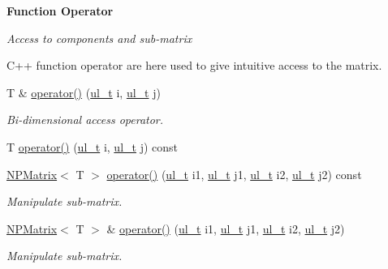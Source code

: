 \begin{Indent}\textbf{ Function Operator}\par
{\em Access to components and sub-\/matrix

C++ function operator are here used to give intuitive access to the matrix. }\begin{DoxyCompactItemize}
\item 
T \& \mbox{\hyperlink{class_n_p_matrix_a437ba12a96e979b50f6d579400b20f6f}{operator()}} (\mbox{\hyperlink{typedef_8h_a1b140a2034db3f5dfe18a987745df43a}{ul\+\_\+t}} i, \mbox{\hyperlink{typedef_8h_a1b140a2034db3f5dfe18a987745df43a}{ul\+\_\+t}} j)
\begin{DoxyCompactList}\small\item\em Bi-\/dimensional access operator. \end{DoxyCompactList}\item 
T \mbox{\hyperlink{class_n_p_matrix_aa512abe782fac9e6b0d2eb1167df4133}{operator()}} (\mbox{\hyperlink{typedef_8h_a1b140a2034db3f5dfe18a987745df43a}{ul\+\_\+t}} i, \mbox{\hyperlink{typedef_8h_a1b140a2034db3f5dfe18a987745df43a}{ul\+\_\+t}} j) const
\item 
\mbox{\hyperlink{class_n_p_matrix}{N\+P\+Matrix}}$<$ T $>$ \mbox{\hyperlink{class_n_p_matrix_ab99139270be6ffff19fdf3b5765f321c}{operator()}} (\mbox{\hyperlink{typedef_8h_a1b140a2034db3f5dfe18a987745df43a}{ul\+\_\+t}} i1, \mbox{\hyperlink{typedef_8h_a1b140a2034db3f5dfe18a987745df43a}{ul\+\_\+t}} j1, \mbox{\hyperlink{typedef_8h_a1b140a2034db3f5dfe18a987745df43a}{ul\+\_\+t}} i2, \mbox{\hyperlink{typedef_8h_a1b140a2034db3f5dfe18a987745df43a}{ul\+\_\+t}} j2) const
\begin{DoxyCompactList}\small\item\em Manipulate sub-\/matrix. \end{DoxyCompactList}\item 
\mbox{\hyperlink{class_n_p_matrix}{N\+P\+Matrix}}$<$ T $>$ \& \mbox{\hyperlink{class_n_p_matrix_a5f7e5d337efe283e3f88716bd2205d55}{operator()}} (\mbox{\hyperlink{typedef_8h_a1b140a2034db3f5dfe18a987745df43a}{ul\+\_\+t}} i1, \mbox{\hyperlink{typedef_8h_a1b140a2034db3f5dfe18a987745df43a}{ul\+\_\+t}} j1, \mbox{\hyperlink{typedef_8h_a1b140a2034db3f5dfe18a987745df43a}{ul\+\_\+t}} i2, \mbox{\hyperlink{typedef_8h_a1b140a2034db3f5dfe18a987745df43a}{ul\+\_\+t}} j2)
\begin{DoxyCompactList}\small\item\em Manipulate sub-\/matrix. \end{DoxyCompactList}\end{DoxyCompactItemize}
\end{Indent}

